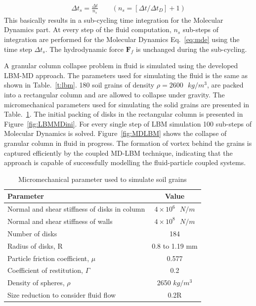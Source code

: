 \begin{align}
\Delta t_{s}=\frac{\Delta t}{\textit{n}_{s}} \qquad(\textit{n}_{s}=[\Delta t/ \Delta t_{D}]+1)
\end{align} 
This basically results in a sub-cycling time integration for the Molecular Dynamics part. At every step of the fluid computation, $\textit{n}_{s}$ sub-steps of integration are performed for the Molecular Dynamics Eq.~\ref{eq:mde} using the time step $\Delta t_{s}$. The hydrodynamic force $\textbf{F}_{f}$ is unchanged during the sub-cycling. 

A granular column collapse problem in fluid is simulated using the developed LBM-MD approach. The parameters used for simulating the fluid is the same as shown in Table.~\ref{t:lbm}. 180 soil grains of density $ \rho = 2600 \mbox{ }kg/m^{3} $, are packed into a rectangular column and are allowed to collapse under gravity. The micromechanical parameters used for simulating the solid grains are presented in Table.~\ref{t:MD}. The initial packing of disks in the rectangular column is presented in Figure~\ref{fig:LBMMDini}. For every single step of LBM simulation 100 sub-steps of Molecular Dynamics is solved. Figure~\ref{fig:MDLBM} shows the collapse of granular column in fluid in progress. The formation of vortex behind the grains is captured efficiently by the coupled MD-LBM technique, indicating that the approach is capable of successfully modelling the fluid-particle coupled systems. 
\begin{table}
\caption{Micromechanical parameter used to simulate soil grains}
\label{t:MD}
\centering
\begin{tabular}{|l|c|}
\hline
\textbf{Parameter} & \textbf{Value} \\ \hline \hline
Normal and shear stiffness of disks in column & $4 \times 10^{6} \mbox{ } N/m$ \\ \hline
Normal and shear stiffness of walls  & $4 \times 10^{8} \mbox{ } N/m$ \\ \hline
Number of disks & 184 \\ \hline
Radius of disks, R &  0.8 to 1.19 mm \\ \hline
Particle friction coefficient, $\mu$ & 0.577 \\ \hline
Coefficient of restitution, $\Gamma$ & 0.2 \\ \hline
Density of spheres, $\rho$ & 2650 $kg/m^{3}$ \\ \hline
Size reduction to consider fluid flow & 0.2R \\ \hline
\end{tabular}
\end{table}

